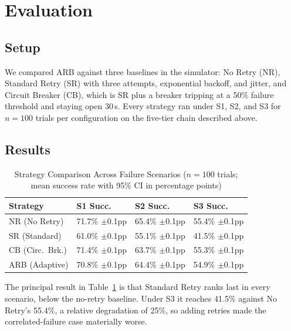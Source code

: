 \documentclass[conference]{IEEEtran}
\begin{document}
\section{Evaluation}
\label{sec:eval}

\subsection{Setup}

We compared ARB against three baselines in the simulator: No Retry (NR), Standard Retry (SR) with three attempts, exponential backoff, and jitter, and Circuit Breaker (CB), which is SR plus a breaker tripping at a 50\% failure threshold and staying open 30\,s. Every strategy ran under S1, S2, and S3 for $n=100$ trials per configuration on the five-tier chain described above.

\subsection{Results}

\begin{table}[htbp]
\caption{Strategy Comparison Across Failure Scenarios ($n=100$ trials; mean success rate with 95\% CI in percentage points)}
\label{tab:strategy_comparison}
\centering
\small
\setlength{\tabcolsep}{4pt}
\begin{tabular}{@{}llll@{}}
\toprule
\textbf{Strategy} & \textbf{S1 Succ.} & \textbf{S2 Succ.} & \textbf{S3 Succ.} \\
\midrule
NR (No Retry)  & 71.7\% $\pm$0.1pp & 65.4\% $\pm$0.1pp & 55.4\% $\pm$0.1pp \\
SR (Standard)  & 61.0\% $\pm$0.1pp & 55.1\% $\pm$0.1pp & 41.5\% $\pm$0.1pp \\
CB (Circ.\ Brk.)  & 71.4\% $\pm$0.1pp & 63.7\% $\pm$0.1pp & 55.3\% $\pm$0.1pp \\
ARB (Adaptive) & 70.8\% $\pm$0.1pp & 64.4\% $\pm$0.1pp & 54.9\% $\pm$0.1pp \\
\bottomrule
\end{tabular}
\end{table}

The principal result in Table~\ref{tab:strategy_comparison} is that Standard Retry ranks last in every scenario, below the no-retry baseline. Under S3 it reaches 41.5\% against No Retry's 55.4\%, a relative degradation of 25\%, so adding retries made the correlated-failure case materially worse.
\end{document}
